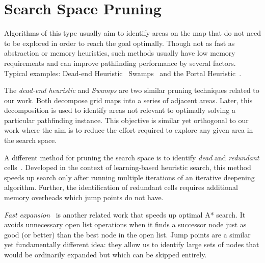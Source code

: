 \section{Search Space Pruning}
\label{cha::lit::pruning}
Algorithms of this type usually aim to identify areas on the map that do not need to be explored in
order to reach the goal optimally. Though not as fast as abstraction or memory
heuristics, such methods usually have low memory requirements and can improve
pathfinding performance by several factors. Typical examples: Dead-end Heuristic~\cite{bjornsson06}
Swamps~\cite{pochter09} and the Portal Heuristic~\cite{goldenberg10}.


The \emph{dead-end heuristic} \cite{bjornsson06} and \emph{Swamps} \cite{pochter10}
are two similar pruning techniques related to our work.
Both decompose grid maps into a series of adjacent areas. Later, this decomposition
is used to identify areas not relevant to optimally solving a particular
pathfinding instance.
This objective is similar yet orthogonal to our work where
the aim is to reduce the effort required to explore any given area in the search
space.

A different method for pruning the search space is to identify \emph{dead} and
\emph{redundant} cells~\cite{sturtevant10b}.  Developed in the context of
learning-based heuristic search, this method speeds up search only after running
multiple iterations of an iterative deepening algorithm.  Further, the
identification of redundant cells requires additional memory overheads which
jump points do not have.

\emph{Fast expansion}~\cite{sun09} is another related work that speeds up
optimal A* search. It avoids unnecessary open list operations when it finds a
successor node just as good (or better) than the best node in the open list.
Jump points are a similar yet fundamentally different idea: they allow us to
identify large sets of nodes that would be ordinarily expanded but which can be
skipped entirely.
